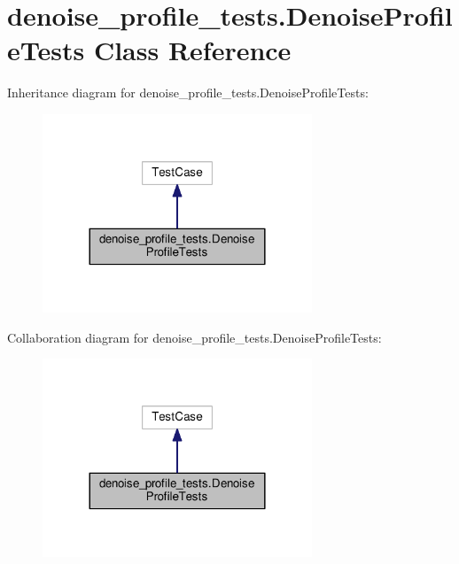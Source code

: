 \hypertarget{classdenoise__profile__tests_1_1DenoiseProfileTests}{\section{denoise\-\_\-profile\-\_\-tests.\-Denoise\-Profile\-Tests Class Reference}
\label{classdenoise__profile__tests_1_1DenoiseProfileTests}
}


Inheritance diagram for denoise\-\_\-profile\-\_\-tests.\-Denoise\-Profile\-Tests\-:
\nopagebreak
\begin{figure}[H]
\begin{center}
\leavevmode
\includegraphics[width=228pt]{classdenoise__profile__tests_1_1DenoiseProfileTests__inherit__graph}
\end{center}
\end{figure}


Collaboration diagram for denoise\-\_\-profile\-\_\-tests.\-Denoise\-Profile\-Tests\-:
\nopagebreak
\begin{figure}[H]
\begin{center}
\leavevmode
\includegraphics[width=228pt]{classdenoise__profile__tests_1_1DenoiseProfileTests__coll__graph}
\end{center}
\end{figure}
